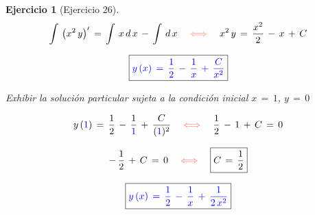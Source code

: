 \documentclass[a4paper,11pt]{book}
\newtheorem{ejer}{Ejercicio}[section]
\begin{document}
\begin{ejer}[Ejercicio 26]
 $$\int\,\left(x^{2}\,y\right)'\,=\,\int\,x\,d\,x\,-\,\int\,d\,x \quad \textcolor{bittersweet}{\iff} \quad x^{2}\,y\,=\,\dfrac{x^{2}}{2}\,-\,x\,+\,C$$  

  

$$\boxed{\textcolor{blue}{y\,(x)\,=\,\dfrac{1}{2}\,-\,\dfrac{1}{x}\,+\,\dfrac{C}{x^{2}} } } $$ 

  

 Exhibir la solución particular sujeta a la condición inicial $x\,=\,1$, $y\,=\,0$ 

  

$$y\,(\textcolor{blue}{1})\,=\,\dfrac{1}{2}\,-\,\dfrac{1}{\textcolor{blue}{1}}\,+\,\dfrac{C}{(\textcolor{blue}{1})^{2}} \quad \textcolor{bittersweet}{\iff} \quad \dfrac{1}{2}\,-\,1\,+\,C\,=\,0$$ 

  

$$-\,\dfrac{1}{2}\,+\,C\,=\,0 \quad \textcolor{bittersweet}{\iff} \quad \boxed{C\,=\,\dfrac{1}{2}}$$ 

  

  

$$\boxed{\textcolor{blue}{y\,(x)\,=\,\dfrac{1}{2}\,-\,\dfrac{1}{x}\,+\,\dfrac{1}{2\,x^{2}} } } $$ 

  



\end{ejer} 

  
\end{document}
